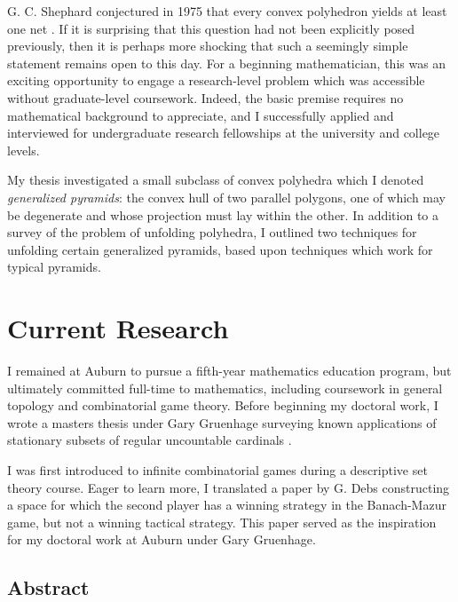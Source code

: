 \documentclass[11pt]{amsart}
\theoremstyle{plain}
\newcommand{\<}{\langle}
\renewcommand{\>}{\rangle}
\newcommand{\term}{\textit}
\begin{document}
G. C. Shephard conjectured in 1975 that every convex polyhedron yields at least
one net \cite{MR0390915}. If it is surprising that this question had
not been explicitly posed previously, then it is perhaps more shocking that
such a seemingly simple statement remains open to this day. For a beginning
mathematician, this was an exciting opportunity to engage a research-level
problem which was accessible without graduate-level coursework.
Indeed, the basic premise requires no mathematical background to appreciate,
and I successfully applied and interviewed for undergraduate research
fellowships at the university and college levels.

My thesis investigated a small subclass of convex polyhedra which I denoted
\term{generalized pyramids}: the convex hull of two parallel polygons, one of
which may be degenerate and whose projection must lay within the other.
In addition to a survey of the problem of unfolding polyhedra, I outlined
two techniques for unfolding certain generalized pyramids, based upon
techniques which work for typical pyramids.


\section*{Current Research}

I remained at Auburn to pursue a fifth-year mathematics education program,
but ultimately committed full-time to mathematics, including coursework in
general topology and combinatorial game theory. Before beginning my doctoral
work, I wrote a masters thesis
under Gary Gruenhage surveying known applications of stationary subsets of
regular uncountable cardinals \cite{MASTERS}.

I was first introduced to infinite combinatorial games during a descriptive
set theory course. Eager to learn more, I translated a paper by G. Debs
\cite{MR817083} constructing a space for which the second player has a winning
strategy in the Banach-Mazur game, but not a winning tactical
strategy. This paper served as the inspiration for my doctoral work at
Auburn under Gary Gruenhage.

\subsection*{Abstract}
\end{document}
